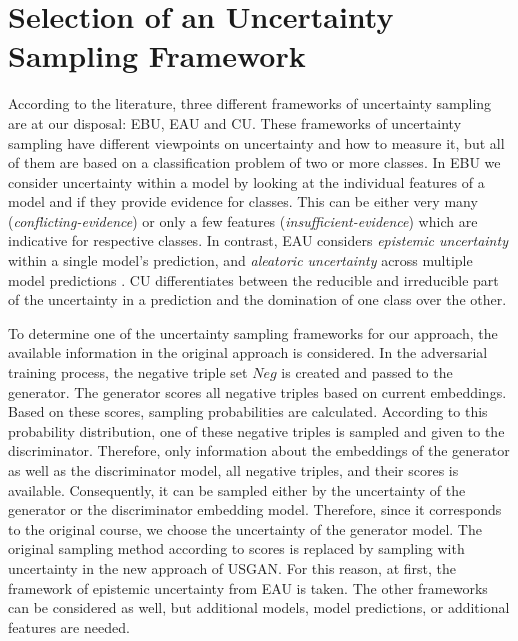 \section{Selection of an Uncertainty Sampling Framework} 
\label{sec:selection_of_an_uncertainty_sampling_type}
%
According to the literature, three different frameworks of uncertainty sampling are at our disposal:
\ac{EBU}, \ac{EAU} and \ac{CU}.
These frameworks of uncertainty sampling have different viewpoints on uncertainty and how to measure it, but all of them are based on a classification problem of two or more classes.
In \ac{EBU} we consider uncertainty within a model by looking at the individual features of a model and if they provide evidence for classes.
This can be either very many (\textit{conflicting-evidence}) or only a few features (\textit{insufficient-evidence}) which are indicative for respective classes.
In contrast, \ac{EAU} considers \textit{epistemic uncertainty} within a single model’s prediction, and \textit{aleatoric uncertainty} across multiple model predictions \cite{human-in-the-loop}.
\Ac{CU} differentiates between the reducible and irreducible part of the uncertainty in a prediction and the domination of one class over the other.

To determine one of the uncertainty sampling frameworks for our approach, the available information in the original \kbgan approach is considered.
In the adversarial training process, the negative triple set $Neg$ is created and passed to the generator.
The generator scores all negative triples based on current embeddings.
Based on these scores, sampling probabilities are calculated.
According to this probability distribution, one of these negative triples is sampled and given to the discriminator.
Therefore, only information about the embeddings of the generator as well as the discriminator model, all negative triples, and their scores is available.
Consequently, it can be sampled either by the uncertainty of the generator or the discriminator embedding model.
Therefore, since it corresponds to the original course, we choose the uncertainty of the generator model.
The original sampling method according to scores is replaced by sampling with uncertainty in the new approach of \textsc{USGAN}.
For this reason, at first, the framework of epistemic uncertainty from \ac{EAU} is taken.
The other frameworks can be considered as well, but additional models, model predictions, or additional features are needed.
%
%
%
%
